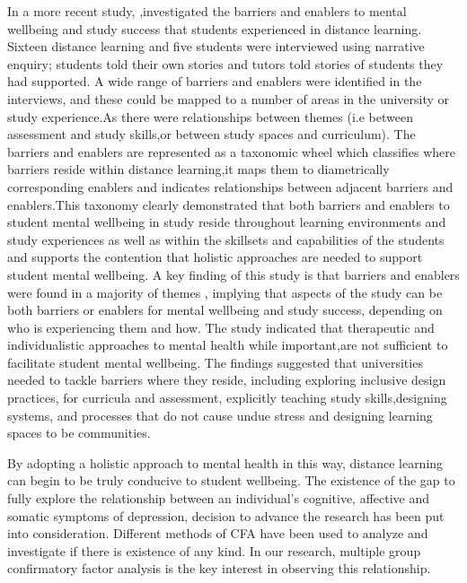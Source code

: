 \documentclass{beamer}
\begin{document}
\begin{frame}
In a more recent study, \cite{lister2023mental},investigated the  barriers and enablers to mental wellbeing and study success that students experienced in distance learning. Sixteen distance learning and five students were interviewed using narrative enquiry; students told their own stories and tutors told stories of students they had supported. A wide range of barriers and enablers were identified in the interviews, and these could be mapped to a number of areas in the university or study experience.As there were relationships between themes (i.e between assessment and study skills,or between study spaces and curriculum). The barriers and enablers are represented as a taxonomic wheel which classifies where barriers reside within distance learning,it maps them to diametrically corresponding enablers and indicates relationships between adjacent barriers and enablers.This taxonomy clearly demonstrated that  both barriers and enablers to student mental wellbeing in study reside throughout learning environments and study experiences as well as within the skillsets and capabilities of the students and supports the contention that holistic approaches are needed to support student mental wellbeing. A key finding of this study is that barriers and enablers were found in a majority of themes , implying that aspects of the study can be both barriers or enablers for mental wellbeing and study success, depending on who is experiencing them and how. The study indicated that therapeutic and individualistic approaches to mental health while important,are not sufficient to facilitate student mental wellbeing. The findings suggested that universities needed to tackle barriers where they reside, including exploring inclusive design practices, for curricula and assessment, explicitly teaching study skills,designing systems, and processes that do not cause undue stress and designing learning spaces to be communities.
\end{frame}
\begin{frame}
	By adopting a holistic approach to mental health in this way, distance learning can begin to be truly conducive to student wellbeing.  The existence of the gap to fully explore the relationship between an individual's cognitive, affective and somatic symptoms of depression, decision to advance the research has been put into consideration. Different methods of CFA have been used to analyze and investigate if there is existence of any kind. In our research, multiple group confirmatory factor analysis is the key interest in observing this relationship.
\end{frame}
\begin{frame}
	
	
\end{frame}
\end{document}
